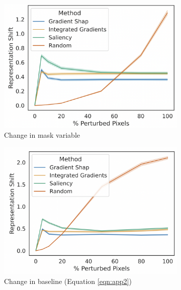 \begin{figure}[h]
\centering
\begin{subfigure}[b]{0.32\linewidth}
\includegraphics[width=\textwidth]{images/feature_imp/approach1.png}
\caption{Change in mask variable}\label{fig:approach1}
\end{subfigure}
\begin{subfigure}[b]{0.32\linewidth}
\includegraphics[width=\textwidth]{images/feature_imp/approach2.png} 
\caption{Change in baseline (Equation \ref{eqn:app2})}\label{fig:approach2}
\end{subfigure}
\begin{subfigure}[b]{0.32\linewidth}

\end{subfigure}
\end{figure}
